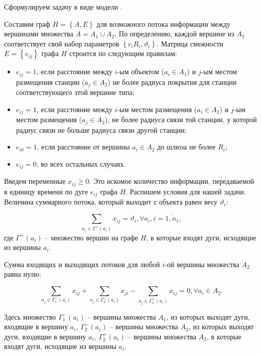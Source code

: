 Сформулируем задачу в виде модели .

Составим граф $ H = \left\{A,E \right\} $ для возможного потока информации между вершинами множества $ A = A_1 \cup A_2 $. По определению, каждой вершине из $ A_2 $ соответствует свой набор параметров $\left\{ r_i  R_i, \vartheta_i \right\} $.
Матрица смежности $E = \left\{ e_{ij} \right\}$ графа $H$ строится по следующим правилам:

\begin{itemize}
    \item $e_{ij} = 1$, если расстояние между $i$-ым объектом ($a_i \in A_1$) и $j$-ым местом размещения станции ($a_j \in A_2$) не более радиуса покрытия для станции соответствующего этой вершине типа; 
    \item $e_{ij} = 1$, если расстояние между $i$-ым местом размещения ($a_i \in A_2$) и $j$-ым местом размещения  ($a_j \in A_2$), не более радиуса связи той станции, у которой радиус связи не больше радиуса связи другой станции;
    \item $e_{i0} = 1$, если расстояние от вершины $a_i \in A_2$ до шлюза не более $R_i$;
    \item $e_{ij} = 0$, во всех остальных случаях.
\end{itemize}

Введем переменные $x_{ij} \geqslant 0$. Это искомое количество информации, передаваемой в единицу времени по дуге $e_{ij}$ графа $H$.
Распишем условия для нашей задачи.
Величина суммарного потока, который выходит с объекта равен весу $\vartheta_i$:

\begin{equation}\label{eq:part2_1.1}
    \sum_{a_j \in \Gamma^+(a_i)} x_{ij} = \vartheta_i, \forall a_i, i=\overline{1, n_1},
\end{equation}
где $\Gamma^+(a_i)$ – множество вершин на графе $H$, в которые входят дуги, исходящие из вершины $a_i$. 

Сумма входящих и выходящих потоков для любой $i$-ой вершины множества $A_2$ равна нулю:

\begin{equation}\label{eq:part2_1.2}
    \sum_{a_j \in \Gamma_1^-(a_i)} x_{ij} + \sum_{a_j \in \Gamma_2^-(a_i)} x_{ji} -  \sum_{a_j \in \Gamma_2^+(a_i)} x_{ij} =0 ,\forall a_i \in A_2. 
\end{equation}

Здесь множество $\Gamma_1^-(a_i)$ – вершины множества $A_1$, из которых выходят дуги, входящие в вершину $a_i$, $\Gamma_2^-(a_i)$ – вершины множества $A_2$, из которых выходят дуги, входящие в  вершину $a_i$, $\Gamma_2^+(a_i)$ – вершины множества $A_2$, в которые входят дуги, исходящие из вершины $a_i$.

